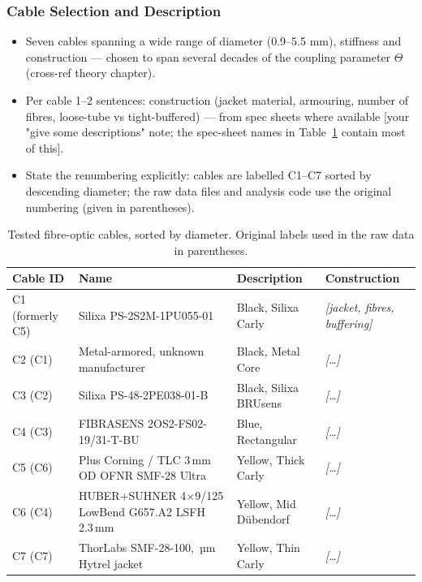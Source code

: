\subsubsection{Cable Selection and Description}
\begin{itemize}
  \item Seven cables spanning a wide range of diameter (0.9–5.5 mm),
    stiffness and construction — chosen to span several decades of the
    coupling parameter $\Theta$ (cross-ref theory chapter).
  \item Per cable 1–2 sentences: construction (jacket material, armouring,
    number of fibres, loose-tube vs tight-buffered) — from spec sheets where
    available [your "give some descriptions" note; the spec-sheet names in
    Table~\ref{tab:methods:cabletypes} contain most of this].
  \item State the renumbering explicitly: cables are labelled C1–C7 sorted by
    descending diameter; the raw data files and analysis code use the
    original numbering (given in parentheses).
\end{itemize}

\begin{table}[H]
  \centering
  \begin{tabularx}{\textwidth}{l l l X}
    \toprule
    \textbf{Cable ID} & \textbf{Name} & \textbf{Description} &
    \textbf{Construction} \\
    \midrule
    C1 (formerly C5) & Silixa PS-2S2M-1PU055-01 & Black, Silixa Carly &
      \textit{[jacket, fibres, buffering]} \\
    C2 (C1) & Metal-armored, unknown manufacturer & Black, Metal Core &
      \textit{[\ldots]} \\
    C3 (C2) & Silixa PS-48-2PE038-01-B & Black, Silixa BRUsens &
      \textit{[\ldots]} \\
    C4 (C3) & FIBRASENS 2OS2-FS02-19/31-T-BU & Blue, Rectangular &
      \textit{[\ldots]} \\
    C5 (C6) & Plus Corning / TLC 3\,mm OD OFNR SMF-28 Ultra & Yellow, Thick
      Carly & \textit{[\ldots]} \\
    C6 (C4) & HUBER+SUHNER 4$\times$9/125 LowBend G657.A2 LSFH 2.3\,mm &
      Yellow, Mid Dübendorf & \textit{[\ldots]} \\
    C7 (C7) & ThorLabs SMF-28-100, \diameter 900\,µm Hytrel jacket & Yellow,
      Thin Carly & \textit{[\ldots]} \\
    \bottomrule
  \end{tabularx}
  \caption[Cable types]{Tested fibre-optic cables, sorted by diameter.
    Original labels used in the raw data in parentheses.}
  \label{tab:methods:cabletypes}
\end{table}

